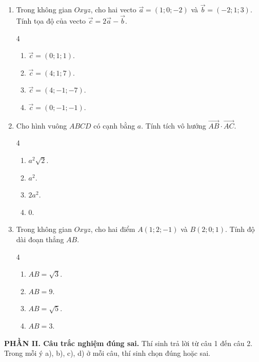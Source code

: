 \documentclass[12pt]{article}
\begin{document}
\begin{enumerate}[label=\textbf{Câu \arabic*.}, leftmargin=*]
		\item Trong không gian $Oxyz$, cho hai vecto $\vec{a} = (1; 0; -2)$ và $\vec{b} = (-2; 1; 3)$. Tính tọa độ của vecto $\vec{c} = 2\vec{a} - \vec{b}$.
		\begin{multicols}{4}
			\begin{enumerate}[label=\Alph*.]
				\item $\vec{c} = (0; 1; 1)$.
				\item $\vec{c} = (4; 1; 7)$.
				\item $\vec{c} = (4; -1; -7)$.
				\item $\vec{c} = (0; -1; -1)$.
			\end{enumerate}
		\end{multicols}
		
		\item Cho hình vuông $ABCD$ có cạnh bằng $a$. Tính tích vô hướng $\overrightarrow{AB} \cdot \overrightarrow{AC}$.
		\begin{multicols}{4}
			\begin{enumerate}[label=\Alph*.]
				\item $a^2\sqrt{2}$.
				\item $a^2$.
				\item $2a^2$.
				\item $0$.
			\end{enumerate}
		\end{multicols}
		
		\item Trong không gian $Oxyz$, cho hai điểm $A(1; 2; -1)$ và $B(2; 0; 1)$. Tính độ dài đoạn thẳng $AB$.
		\begin{multicols}{4}
			\begin{enumerate}[label=\Alph*.]
				\item $AB = \sqrt{3}$.
				\item $AB = 9$.
				\item $AB = \sqrt{5}$.
				\item $AB = 3$.
			\end{enumerate}
		\end{multicols}
	\end{enumerate}
	
	\noindent\textbf{PHẦN II. Câu trắc nghiệm đúng sai.} Thí sinh trả lời từ câu 1 đến câu 2. Trong mỗi ý a), b), c), d) ở mỗi câu, thí sinh chọn đúng hoặc sai.
	\vspace{2mm}
	
\end{document}
